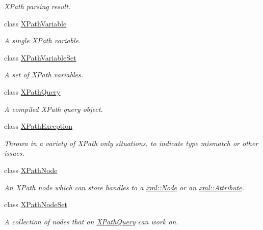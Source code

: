 \begin{DoxyCompactItemize}
\begin{DoxyCompactList}\small\item\em XPath parsing result. \item\end{DoxyCompactList}\item 
class \hyperlink{classphys_1_1xml_1_1XPathVariable}{XPathVariable}
\begin{DoxyCompactList}\small\item\em A single XPath variable. \item\end{DoxyCompactList}\item 
class \hyperlink{classphys_1_1xml_1_1XPathVariableSet}{XPathVariableSet}
\begin{DoxyCompactList}\small\item\em A set of XPath variables. \item\end{DoxyCompactList}\item 
class \hyperlink{classphys_1_1xml_1_1XPathQuery}{XPathQuery}
\begin{DoxyCompactList}\small\item\em A compiled XPath query object. \item\end{DoxyCompactList}\item 
class \hyperlink{classphys_1_1xml_1_1XPathException}{XPathException}
\begin{DoxyCompactList}\small\item\em Thrown in a variety of XPath only situations, to indicate type mismatch or other issues. \item\end{DoxyCompactList}\item 
class \hyperlink{classphys_1_1xml_1_1XPathNode}{XPathNode}
\begin{DoxyCompactList}\small\item\em An XPath node which can store handles to a \hyperlink{classphys_1_1xml_1_1Node}{xml::Node} or an \hyperlink{classphys_1_1xml_1_1Attribute}{xml::Attribute}. \item\end{DoxyCompactList}\item 
class \hyperlink{classphys_1_1xml_1_1XPathNodeSet}{XPathNodeSet}
\begin{DoxyCompactList}\small\item\em A collection of nodes that an \hyperlink{classphys_1_1xml_1_1XPathQuery}{XPathQuery} can work on. \item\end{DoxyCompactList}\end{DoxyCompactItemize}
